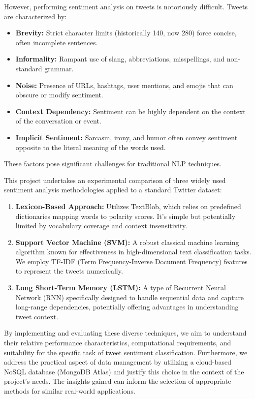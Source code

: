 \documentclass[10pt,twocolumn]{article}
\begin{document}
However, performing sentiment analysis on tweets is notoriously difficult. Tweets are characterized by:
\begin{itemize}[leftmargin=*, itemsep=0pt, topsep=3pt]
    \item \textbf{Brevity:} Strict character limits (historically 140, now 280) force concise, often incomplete sentences.
    \item \textbf{Informality:} Rampant use of slang, abbreviations, misspellings, and non-standard grammar.
    \item \textbf{Noise:} Presence of URLs, hashtags, user mentions, and emojis that can obscure or modify sentiment.
    \item \textbf{Context Dependency:} Sentiment can be highly dependent on the context of the conversation or event. %
    \item \textbf{Implicit Sentiment:} Sarcasm, irony, and humor often convey sentiment opposite to the literal meaning of the words used. %
\end{itemize}
These factors pose significant challenges for traditional NLP techniques.

This project undertakes an experimental comparison of three widely used sentiment analysis methodologies applied to a standard Twitter dataset:
\begin{enumerate}[label=\arabic*), leftmargin=*, itemsep=0pt, topsep=3pt]
    \item \textbf{Lexicon-Based Approach:} Utilizes TextBlob, which relies on predefined dictionaries mapping words to polarity scores. It's simple but potentially limited by vocabulary coverage and context insensitivity.
    \item \textbf{Support Vector Machine (SVM):} A robust classical machine learning algorithm known for effectiveness in high-dimensional text classification tasks. We employ TF-IDF (Term Frequency-Inverse Document Frequency) features to represent the tweets numerically.
    \item \textbf{Long Short-Term Memory (LSTM):} A type of Recurrent Neural Network (RNN) specifically designed to handle sequential data and capture long-range dependencies, potentially offering advantages in understanding tweet context.
\end{enumerate}

By implementing and evaluating these diverse techniques, we aim to understand their relative performance characteristics, computational requirements, and suitability for the specific task of tweet sentiment classification. Furthermore, we address the practical aspect of data management by utilizing a cloud-based NoSQL database (MongoDB Atlas) and justify this choice in the context of the project's needs. The insights gained can inform the selection of appropriate methods for similar real-world applications.
\end{document}
